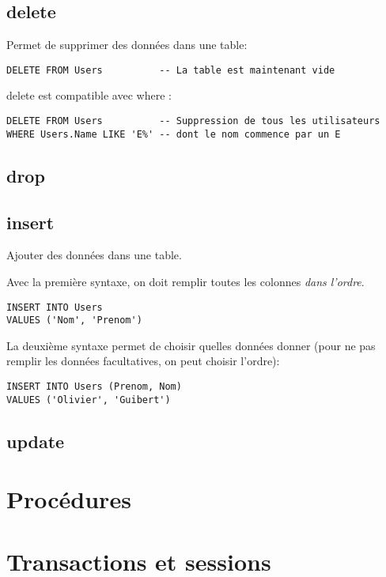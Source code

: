 \documentclass[10pt,a4paper,french]{article}
\begin{document}
\subsection{\gls{delete}}

Permet de supprimer des données dans une table:
\begin{verbatim}
DELETE FROM Users          -- La table est maintenant vide
\end{verbatim}

\gls{delete} est compatible avec \gls{where} :
\begin{verbatim}
DELETE FROM Users          -- Suppression de tous les utilisateurs
WHERE Users.Name LIKE 'E%' -- dont le nom commence par un E
\end{verbatim}

\subsection{\gls{drop}}

\subsection{\gls{insert}}\label{insert}

Ajouter des données dans une table.

Avec la première syntaxe, on doit remplir toutes les colonnes \textit{dans l'ordre}.
\begin{verbatim}
INSERT INTO Users
VALUES ('Nom', 'Prenom')
\end{verbatim}

La deuxième syntaxe permet de choisir quelles données donner (pour ne pas remplir les données facultatives, on peut choisir l'ordre):
\begin{verbatim}
INSERT INTO Users (Prenom, Nom)
VALUES ('Olivier', 'Guibert')
\end{verbatim}

\subsection{\gls{update}}\label{update}

\section{Procédures}

\section{Transactions et sessions}
\end{document}
